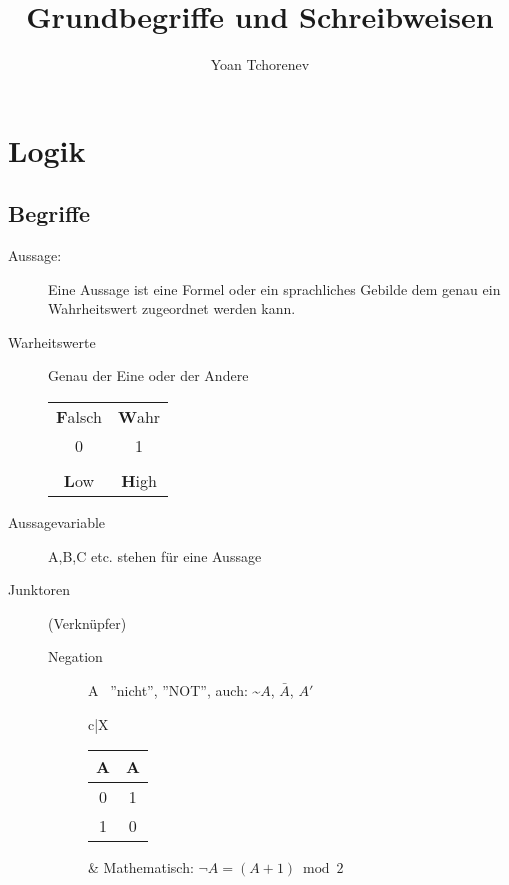 \documentclass[12pt,a4paper]{article}
\title{Grundbegriffe und Schreibweisen}
\author{Yoan Tchorenev}
\begin{document}
\begin{titlepage}
	\maketitle
	\tableofcontents
\end{titlepage}

\section{Logik}
\subsection{Begriffe}
\begin{description}
	\item[Aussage:] Eine Aussage ist eine Formel oder ein sprachliches Gebilde dem genau ein Wahrheitswert zugeordnet werden kann.
	
	\item[Warheitswerte] Genau der Eine oder der Andere \\
		\begin{tabular}{c|c}
			\textbf{F}alsch & \textbf{W}ahr \\
			0 & 1 \\
			\bot & \top \\
			\textbf{L}ow & \textbf{H}igh
		\end{tabular}
	
	\item[Aussagevariable] A,B,C etc. stehen für eine Aussage
	
	\item[Junktoren] (Verknüpfer)
		\begin{description}
			\item[Negation] \neg A \, ''nicht'', ''NOT'', auch: \textasciitilde $A$, $\bar{A}$, $A'$ \\
				\begin{tabularx}{\linewidth}{c|X}
					\begin{tabular}[t]{c|c}
						A & \neg A  \\ \hline
						0 & 1 \\
						1 & 0
					\end{tabular} &
					Mathematisch: $\neg A = (A + 1) \bmod 2$ \\ \hline
				\end{tabularx}
			

\end{description}
\end{description}
\end{document}
